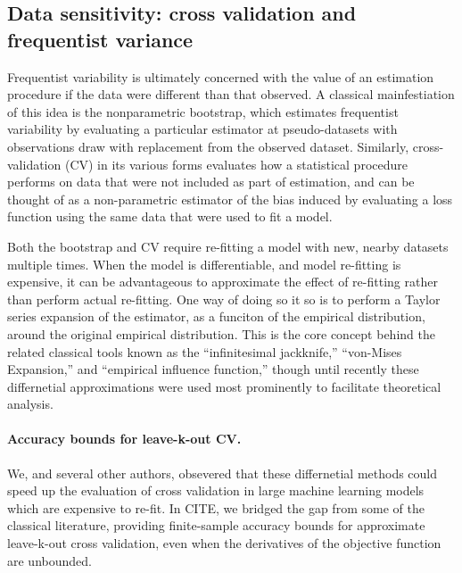 \subsection{Data sensitivity: cross validation and frequentist variance}

Frequentist variability is ultimately concerned with the value of an
estimation procedure if the data were different than that observed.  A classical
mainfestiation of this idea is the nonparametric bootstrap, which estimates
frequentist variability by evaluating a particular estimator at pseudo-datasets
with observations draw with replacement from the observed dataset.  Similarly,
cross-validation (CV) in its various forms evaluates how a statistical procedure
performs on data that were not included as part of estimation, and can be
thought of as a non-parametric estimator of the bias induced by evaluating
a loss function using the same data that were used to fit a model.

Both the bootstrap and CV require re-fitting a model with new, nearby datasets
multiple times.  When the model is differentiable, and model re-fitting is
expensive, it can be advantageous to approximate the effect of re-fitting rather
than perform actual re-fitting.  One way of doing so it so is to perform a
Taylor series expansion of the estimator, as a funciton of the empirical
distribution, around the original empirical distribution.  This is the core
concept behind the related classical tools known as the ``infinitesimal
jackknife,'' ``von-Mises Expansion,'' and ``empirical influence function,''
though until recently these differnetial approximations were used most
prominently to facilitate theoretical analysis.


\paragraph{Accuracy bounds for leave-k-out CV.}

We, and several other authors, obsevered that these differnetial methods
could speed up the evaluation of cross validation in large machine learning
models which are expensive to re-fit.  In CITE, we bridged the gap from
some of the classical literature, providing finite-sample accuracy bounds
for approximate leave-k-out cross validation, even when the derivatives of
the objective function are unbounded.


